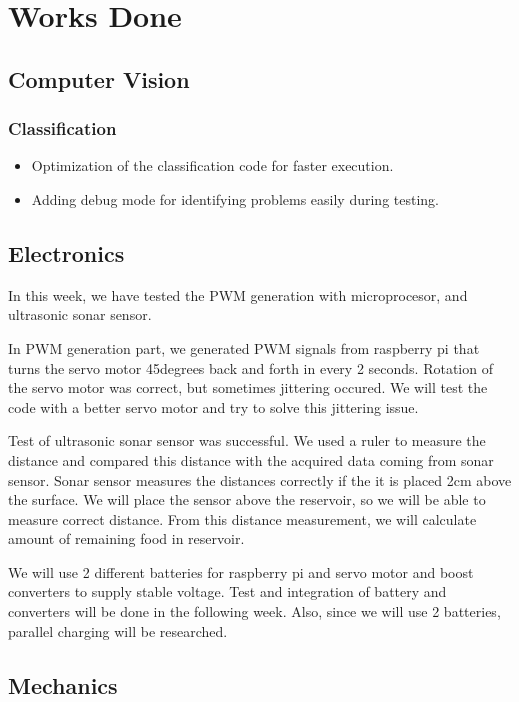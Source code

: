 \section{Works Done}
\label{sec:worksDone}

\subsection{Computer Vision}
\subsubsection{Classification}

\begin{itemize}
    \item Optimization of the classification code for faster execution.
    \item Adding debug mode for identifying problems easily during testing.
\end{itemize}

\subsection{Electronics}

In this week, we have tested the PWM generation with microprocesor, and ultrasonic sonar sensor.

In PWM generation part, we generated PWM signals from raspberry pi that turns the servo motor 45degrees back and forth in every 2 seconds. Rotation of the servo motor was correct, but sometimes jittering occured. We will test the code with a better servo motor and try to solve this jittering issue.

Test of ultrasonic sonar sensor was successful. We used a ruler to measure the distance and compared this distance with the acquired data coming from sonar sensor. Sonar sensor measures the distances correctly if the it is placed 2cm above the surface. We will place the sensor above the reservoir, so we will be able to measure correct distance. From this distance measurement, we will calculate amount of remaining food in reservoir.

We will use 2 different batteries for raspberry pi and servo motor and boost converters to supply stable voltage. Test and integration of battery and converters will be done in the following week. Also, since we will use 2 batteries, parallel charging will be researched.

\subsection{Mechanics}

